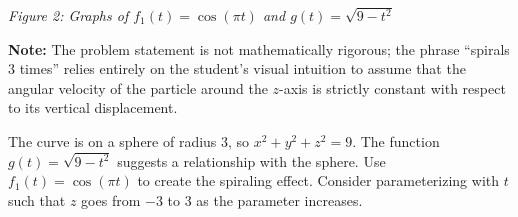 \begin{problem}
\begin{center}
\end{center}
\vspace{0.3em}
\noindent\textit{Figure 2: Graphs of $f_1(t)=\cos(\pi t)$ and $g(t)=\sqrt{9-t^{2}}$}

\vspace{0.5em}
\noindent
\textbf{Note:} The problem statement is not mathematically rigorous; the phrase ``spirals 3 times'' relies entirely on the student's visual intuition to assume that the angular velocity of the particle around the $z$-axis is strictly constant with respect to its vertical displacement.
\end{problem}

\begin{hint}
The curve is on a sphere of radius 3, so $x^2 + y^2 + z^2 = 9$. The function $g(t) = \sqrt{9-t^2}$ suggests a relationship with the sphere. Use $f_1(t) = \cos(\pi t)$ to create the spiraling effect. Consider parameterizing with $t$ such that $z$ goes from $-3$ to $3$ as the parameter increases.
\end{hint}

